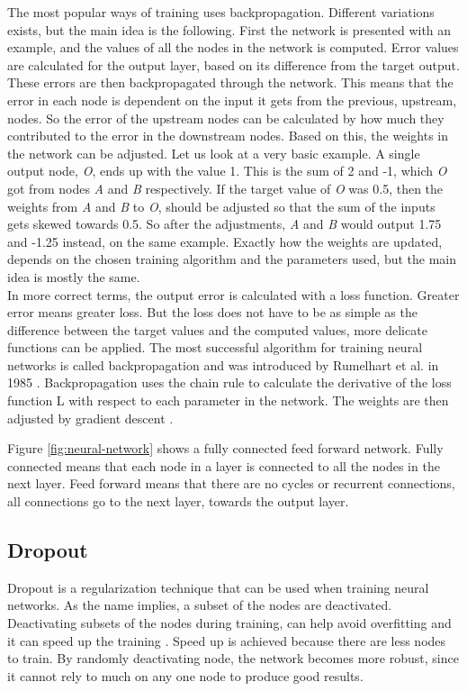 The most popular ways of training uses backpropagation. Different variations exists, but the main idea is the following. First the network is presented with an example, and the values of all the nodes in the network is computed. Error values are calculated for the output layer, based on its difference from the target output. These errors are then backpropagated through the network. This means that the error in each node is dependent on the input it gets from the previous, upstream, nodes. So the error of the upstream nodes can be calculated by how much they contributed to the error in the downstream nodes. Based on this, the weights in the network can be adjusted. Let us look at a very basic example. A single output node, \textit{O}, ends up with the value 1. This is the sum of 2 and -1, which \textit{O} got from nodes \textit{A} and \textit{B} respectively. If the target value of \textit{O} was 0.5, then the weights from \textit{A} and \textit{B} to \textit{O}, should be adjusted so that the sum of the inputs gets skewed towards 0.5. So after the adjustments, \textit{A} and \textit{B} would output 1.75 and -1.25 instead, on the same example. Exactly how the weights are updated, depends on the chosen training algorithm and the parameters used, but the main idea is mostly the same.\\

In more correct terms, the output error is calculated with a loss function. Greater error means greater loss. But the loss does not have to be as simple as the difference between the target values and the computed values, more delicate functions can be applied. The most successful algorithm for training neural networks is called backpropagation and was introduced by Rumelhart et al. in 1985 \cite{DBLP:journals/corr/Lipton15} \cite{Rumelhart:1986:LIR:104279.104293}. Backpropagation uses the chain rule to calculate the derivative of the loss function L with respect to each parameter in the network. The weights are then adjusted by gradient descent \cite{DBLP:journals/corr/Lipton15}.

Figure \ref{fig:neural-network} shows a fully connected feed forward network. Fully connected means that each node in a layer is connected to all the nodes in the next layer. Feed forward means that there are no cycles or recurrent connections, all connections go to the next layer, towards the output layer.

\subsection{Dropout}
Dropout is a regularization technique that can be used when training neural networks. As the name implies, a subset of the nodes are deactivated. Deactivating subsets of the nodes during training, can help avoid overfitting and it can speed up the training \cite{Srivastava:2014:DSW:2627435.2670313}. Speed up is achieved because there are less nodes to train. By randomly deactivating node, the network becomes more robust, since it cannot rely to much on any one node to produce good results.

